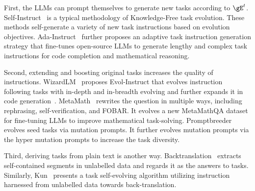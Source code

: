\documentclass[sn-basic, Numbered]{sn-jnl}%
\theoremstyle{thmstyleone}%
\theoremstyle{thmstyletwo}%
\theoremstyle{thmstylethree}%
\begin{document}

First, the LLMs can prompt themselves to generate new tasks according to $\gE^{t}$.
Self-Instruct~\cite{wang2023self, honovich2022unnatural, roziere2023code} is a typical methodology of Knowledge-Free task evolution. These methods self-generate a variety of new task instructions based on evolution objectives.
Ada-Instruct~\cite{cui2023ada} further proposes an adaptive task instruction generation strategy that fine-tunes open-source LLMs to generate lengthy and complex task instructions for code completion and mathematical reasoning. 

Second, extending and boosting original tasks increases the quality of instructions.
WizardLM~\cite{xu2023wizardlm} proposes Evol-Instruct that evolves instruction following tasks with in-depth and in-breadth evolving and further expands it in code generation~\cite{luo2024wizardcoder}.
MetaMath~\cite{yu2023metamath} rewrites the question in multiple ways, including rephrasing, self-verification, and FOBAR. It evolves a new MetaMathQA dataset for fine-tuning LLMs to improve mathematical task-solving.
Promptbreeder~\cite{fernando2023promptbreeder} evolves seed tasks via mutation prompts. It further evolves mutation prompts via the hyper mutation prompts to increase the task diversity.


Third, deriving tasks from plain text is another way. 
Backtranslation~\cite{li2023self} extracts self-contained segments in unlabelled data and regards it as the answers to tasks. 
Similarly, Kun~\cite{zheng2024kun} presents a task self-evolving algorithm utilizing instruction harnessed from unlabelled data towards back-translation. 

\end{document}
